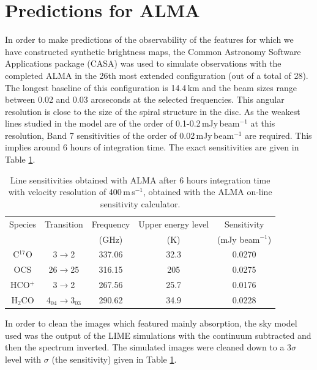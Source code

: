 \documentclass[useAMS,usenatbib]{mn2e}
\begin{document}
\section{Predictions for ALMA} \label{sec:alma_predictions}

In order to make predictions of the observability of the features for which we have constructed synthetic brightness maps, the Common Astronomy Software Applications package (CASA) was used to simulate observations with the completed ALMA in the 26th most extended configuration (out of a total of 28). The longest baseline of this configuration is 14.4\,km and the beam sizes range between 0.02 and 0.03 arcseconds at the selected frequencies. This angular resolution is close to the size of the spiral structure in the disc. As the weakest lines studied in the model are of the order of 0.1-0.2$\,$mJy$\,$beam$^{-1}$ at this resolution, Band 7 sensitivities of the order of 0.02$\,$mJy$\,$beam$^{-1}$ are required. This implies around 6 hours of integration time. The exact sensitivities are given in Table \ref{sigmas}.
\begin{table}
  \centering
  \begin{minipage}{90mm}
    \caption{Line sensitivities obtained with ALMA after 6 hours integration time with velocity resolution of 400$\,$m\,s$^{-1}$, obtained with the ALMA on-line sensitivity calculator.}
    \label{sigmas}
    \begin{tabular}{c||c|c|c|c}
      \hline
      Species & Transition & Frequency & Upper energy level & Sensitivity\\
                      &                    & (GHz)            & (K)                            & (mJy beam$^{-1}$) \\
      \hline
      C$^{17}$O & 3$\rightarrow$2 & 337.06 & 32.3 & 0.0270 \\
      OCS & 26$\rightarrow$25 & 316.15 & 205 & 0.0275 \\
      HCO$^+$ & 3$\rightarrow$2 & 267.56 & 25.7 & 0.0176 \\
      H$_2$CO & 4$_{04}\rightarrow$3$_{03}$ &  290.62 & 34.9 & 0.0228 \\
      \hline
    \end{tabular}
  \end{minipage}
\end{table}
In order to clean the images which featured mainly absorption, the sky model used was the output of the LIME simulations with the continuum subtracted and then the spectrum inverted. The simulated images were cleaned down to a 3$\sigma$ level with $\sigma$ (the sensitivity) given in Table \ref{sigmas}.\smallskip
\end{document}
